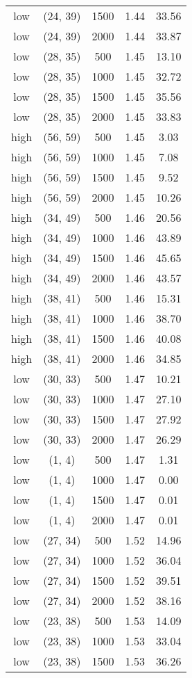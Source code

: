 \begin{tabular}{c c c c c}
low & (24, 39) &  1500 & 1.44 & 33.56 \\
low & (24, 39) &  2000 & 1.44 & 33.87 \\
low & (28, 35) &  500 & 1.45 & 13.10 \\
low & (28, 35) &  1000 & 1.45 & 32.72 \\
low & (28, 35) &  1500 & 1.45 & 35.56 \\
low & (28, 35) &  2000 & 1.45 & 33.83 \\
high & (56, 59) &  500 & 1.45 & 3.03 \\
high & (56, 59) &  1000 & 1.45 & 7.08 \\
high & (56, 59) &  1500 & 1.45 & 9.52 \\
high & (56, 59) &  2000 & 1.45 & 10.26 \\
high & (34, 49) &  500 & 1.46 & 20.56 \\
high & (34, 49) &  1000 & 1.46 & 43.89 \\
high & (34, 49) &  1500 & 1.46 & 45.65 \\
high & (34, 49) &  2000 & 1.46 & 43.57 \\
high & (38, 41) &  500 & 1.46 & 15.31 \\
high & (38, 41) &  1000 & 1.46 & 38.70 \\
high & (38, 41) &  1500 & 1.46 & 40.08 \\
high & (38, 41) &  2000 & 1.46 & 34.85 \\
low & (30, 33) &  500 & 1.47 & 10.21 \\
low & (30, 33) &  1000 & 1.47 & 27.10 \\
low & (30, 33) &  1500 & 1.47 & 27.92 \\
low & (30, 33) &  2000 & 1.47 & 26.29 \\
low & (1, 4) &  500 & 1.47 & 1.31 \\
low & (1, 4) &  1000 & 1.47 & 0.00 \\
low & (1, 4) &  1500 & 1.47 & 0.01 \\
low & (1, 4) &  2000 & 1.47 & 0.01 \\
low & (27, 34) &  500 & 1.52 & 14.96 \\
low & (27, 34) &  1000 & 1.52 & 36.04 \\
low & (27, 34) &  1500 & 1.52 & 39.51 \\
low & (27, 34) &  2000 & 1.52 & 38.16 \\
low & (23, 38) &  500 & 1.53 & 14.09 \\
low & (23, 38) &  1000 & 1.53 & 33.04 \\
low & (23, 38) &  1500 & 1.53 & 36.26 \\

\end{tabular}
